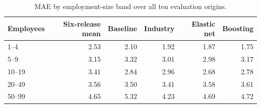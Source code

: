 \begin{table}[H]
\centering
\small
\caption{MAE by employment-size band over all ten evaluation origins.}\label{tab:size}
\begin{tabular}{lrrrrr}
\toprule
Employees & Six-release mean & Baseline & Industry & Elastic net & Boosting \\
\midrule
1--4 & 2.53 & 2.10 & 1.92 & 1.87 & 1.75 \\
5--9 & 3.15 & 3.32 & 3.01 & 2.98 & 3.17 \\
10--19 & 3.41 & 2.84 & 2.96 & 2.68 & 2.78 \\
20--49 & 3.56 & 3.50 & 3.41 & 3.58 & 3.61 \\
50--99 & 4.65 & 5.32 & 4.23 & 4.69 & 4.72 \\
\bottomrule
\end{tabular}
\end{table}
